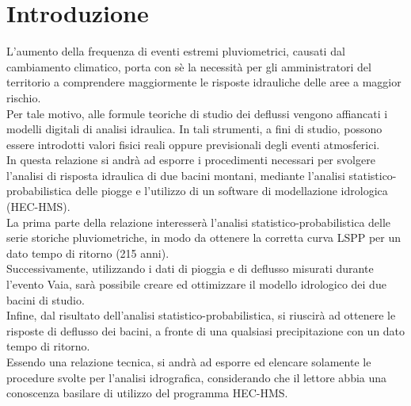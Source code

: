 \section{Introduzione}
L'aumento della frequenza di eventi estremi pluviometrici, causati dal cambiamento climatico, porta con sè la necessità per gli amministratori del territorio a comprendere maggiormente le risposte idrauliche delle aree a maggior rischio.\\
Per tale motivo, alle formule teoriche di studio dei deflussi vengono affiancati i modelli digitali di analisi idraulica. In tali strumenti, a fini di studio, possono essere introdotti valori fisici reali oppure previsionali degli eventi atmosferici.\\ 
In questa relazione si andrà ad esporre i procedimenti necessari per svolgere l'analisi di risposta idraulica di due bacini montani, mediante l'analisi statistico-probabilistica delle piogge e l'utilizzo di un software di modellazione idrologica (HEC-HMS).\\
La prima parte della relazione interesserà l'analisi statistico-probabilistica delle serie storiche pluviometriche, in modo da ottenere la corretta curva LSPP per un dato tempo di ritorno (215 anni).\\
Successivamente, utilizzando i dati di pioggia e di deflusso misurati durante l'evento Vaia, sarà possibile creare ed ottimizzare il modello idrologico dei due bacini di studio.\\
Infine, dal risultato dell'analisi statistico-probabilistica, si riuscirà ad ottenere le risposte di deflusso dei bacini, a fronte di una qualsiasi precipitazione con un dato tempo di ritorno.\\
Essendo una relazione tecnica, si andrà ad esporre ed elencare solamente le procedure svolte per l'analisi idrografica, considerando che il lettore abbia una conoscenza basilare di utilizzo del programma HEC-HMS.